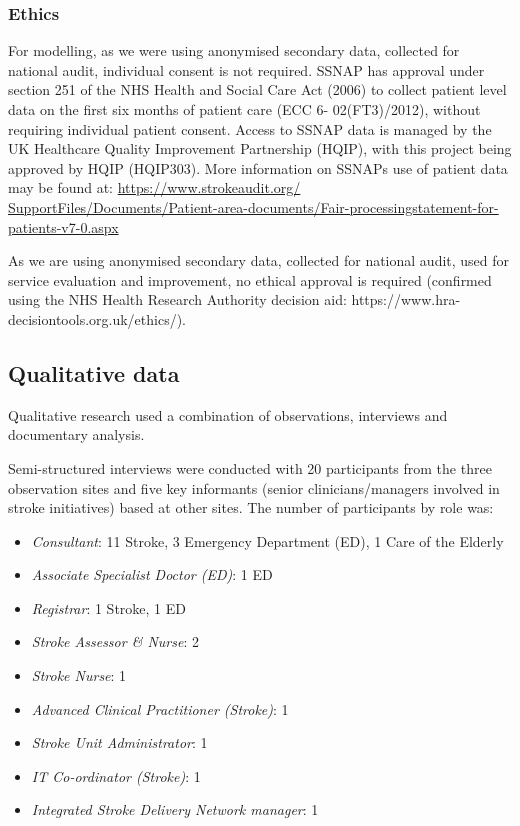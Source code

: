 \subsubsection{Ethics}

For modelling, as we were using anonymised secondary data, collected for national audit, individual consent is not required. SSNAP has approval under section 251 of the NHS Health and Social Care Act (2006) to collect patient level data on the first six months of patient care (ECC 6- 02(FT3)/2012), without requiring individual patient consent. Access to SSNAP data is managed by the UK Healthcare Quality Improvement Partnership (HQIP), with this project being approved by HQIP (HQIP303). More information on SSNAPs use of patient data may be found at: \url{https://www.strokeaudit.org/ SupportFiles/Documents/Patient-area-documents/Fair-processingstatement-for-patients-v7-0.aspx}

As we are using anonymised secondary data, collected for national audit, used for service evaluation and improvement, no ethical approval is required (confirmed using the NHS Health Research Authority decision aid: https://www.hra-decisiontools.org.uk/ethics/).

\subsection{Qualitative data}

Qualitative research used a combination of observations, interviews and documentary analysis.

Semi-structured interviews were conducted with 20 participants from the three observation sites and five key informants (senior clinicians/managers involved in stroke initiatives) based at other sites. The number of participants by role was:

\begin{itemize}

    \item \textit{Consultant}: 11 Stroke, 3 Emergency Department (ED), 1 Care of the Elderly

    \item \textit{Associate Specialist Doctor (ED)}: 1 ED

    \item \textit{Registrar}: 1 Stroke, 1 ED 

    \item \textit{Stroke Assessor \& Nurse}: 2

    \item \textit{Stroke Nurse}: 1
    
    \item \textit{Advanced Clinical Practitioner (Stroke)}: 1

    \item \textit{Stroke Unit Administrator}: 1

    \item \textit{IT Co-ordinator (Stroke)}: 1

    \item \textit{Integrated Stroke Delivery Network manager}: 1
    
\end{itemize}

